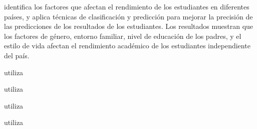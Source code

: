 \textcite{oskouei2014predicting} identifica los factores que afectan el rendimiento de los estudiantes en diferentes países, y aplica técnicas de clasificación y predicción para mejorar la precisión de las predicciones de los resultados de los estudiantes. Los resultados muestran que los factores de género, entorno familiar, nivel de educación de los padres, y el estilo de vida afectan el rendimiento académico de los estudiantes independiente del país.

\textcite{rgonzalez2012} utiliza

\textcite{Shah2016} utiliza

\textcite{rgonzalez2015} utiliza

\textcite{hassan2013beyond} utiliza







